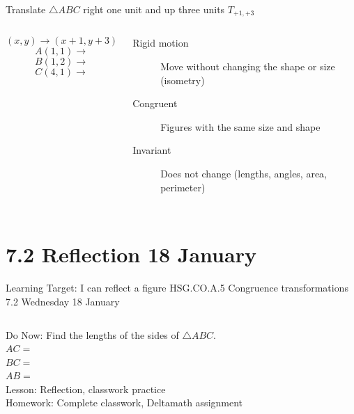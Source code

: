 \documentclass[onlytextwidth, aspectratio=169]{beamer}
\begin{document}
\begin{frame}{Translate $\triangle ABC$ right one unit and up three units $T_{+1,+3}$}
    \begin{columns}
        $$(x,y) \rightarrow (x+1,y+3)$$
        $$A(1,1) \rightarrow$$
        $$B(1,2) \rightarrow$$
        $$C(4,1) \rightarrow$$

        \begin{description}
            \item[Rigid motion] Move without changing the shape or size (isometry)
            \item[Congruent] Figures with the same size and shape
            \item[Invariant] Does not change (lengths, angles, area, perimeter)
          \end{description}
    \begin{flushright}
    \end{flushright}
\end{columns}
\end{frame}

\section{7.2 Reflection \hfill 18 January \,}
\begin{frame}{Learning Target: I can reflect a figure}
  {HSG.CO.A.5 Congruence transformations \hfill \alert{7.2 Wednesday 18 January}}
  \begin{columns}
    Do Now: Find the lengths of the sides of $\triangle ABC$. \\
    $AC=$ \\
    $BC=$ \\
    $AB=$ \\[0.5cm]
    Lesson: Reflection, classwork practice \\
    Homework: Complete classwork, Deltamath assignment
    \begin{flushright}
    \end{flushright}
  \end{columns}
\end{frame}
\end{document}
